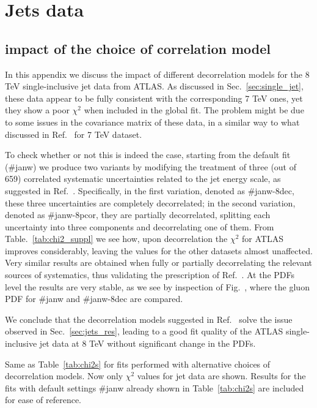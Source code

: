 \chapter{Jets data}
\label{app:jets}
\section{impact of the choice of correlation model}
In this appendix we discuss the impact of different decorrelation models for the 8 TeV single-inclusive jet data
from ATLAS.
As discussed in Sec.~\ref{sec:single_jet}, these data appear to be fully consistent with the corresponding
7 TeV ones, yet they show a poor $\chi^2$ when included in the global fit.
The problem might be due to some issues in the covariance matrix of these data, in a similar way 
to what discussed in Ref.~\cite{Harland-Lang:2017ytb} for 7 TeV dataset.

%
To check whether or not this is indeed the case, starting from the default fit (\#janw) we produce two variants 
by modifying the treatment of three (out of 659) correlated systematic uncertainties
related to the jet energy scale, as suggested in Ref.~\cite{Aaboud:2017dvo}.
Specifically, in the first variation, denoted as \#janw-8dec, these three uncertainties are completely decorrelated;
in the second variation, denoted as \#janw-8pcor, they are partially decorrelated, splitting each uncertainty 
into three components and decorrelating one of them.
From Table.~\ref{tab:chi2_suppl} we see how, upon decorrelation the $\chi^2$ for ATLAS improves considerably, leaving the 
values for the other datasets almost unaffected. Very similar results are obtained when fully or partially 
decorrelating the relevant sources of systematics, thus validating the prescription of Ref.~\cite{Aaboud:2017dvo}.
At the PDFs level the results are very stable, as we see by inspection of Fig.~, where the gluon PDF for 
\#janw and \#janw-8dec are compared.

%
We conclude that the decorrelation models suggested in Ref.~\cite{Aaboud:2017dvo} solve the issue observed in
Sec.~\ref{sec:jets_res}, leading to a good fit quality of the ATLAS single-inclusive jet data at 8 TeV without
significant change in the PDFs.

\begin{table}[!t]
    \renewcommand*{\arraystretch}{1.60}
    \scriptsize
    \centering
    
    \vspace{0.3cm}
    \caption{Same as Table~\ref{tab:chi2s} for
      fits performed with alternative choices of decorrelation models.
      Now only $\chi^2$ values for jet data are shown. Results for the fits with default settings
      \#janw already shown  in Table~\ref{tab:chi2s} are included for ease of reference.}
    \label{tab:chi2_suppl}
\end{table}

